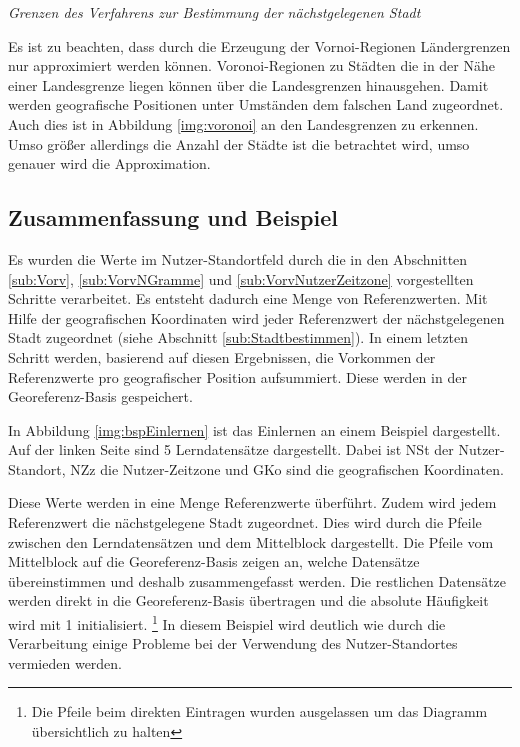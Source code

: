 			\textit{Grenzen des Verfahrens zur Bestimmung der nächstgelegenen Stadt}

				Es ist zu beachten, dass durch die Erzeugung der Vornoi-Regionen Ländergrenzen nur approximiert werden können. 
				Voronoi-Regionen zu Städten die in der Nähe einer Landesgrenze liegen können über die Landesgrenzen hinausgehen. 
				Damit werden geografische Positionen unter Umständen dem falschen Land zugeordnet.
				Auch dies ist in Abbildung \ref{img:voronoi} an den Landesgrenzen zu erkennen. 
				Umso größer allerdings die Anzahl der Städte ist die betrachtet wird, umso genauer wird die Approximation. 

		\subsection{Zusammenfassung und Beispiel}

			Es wurden die Werte im Nutzer-Standortfeld durch die in den Abschnitten \ref{sub:Vorv}, \ref{sub:VorvNGramme} und \ref{sub:VorvNutzerZeitzone} vorgestellten Schritte verarbeitet.
			Es entsteht dadurch eine Menge von Referenzwerten.
			Mit Hilfe der geografischen Koordinaten wird jeder Referenzwert der nächstgelegenen Stadt zugeordnet (siehe Abschnitt \ref{sub:Stadtbestimmen}). 
			In einem letzten Schritt werden, basierend auf diesen Ergebnissen, die Vorkommen der Referenzwerte pro geografischer Position aufsummiert.
			Diese werden in der Georeferenz-Basis gespeichert.

			In Abbildung \ref{img:bspEinlernen} ist das Einlernen an einem Beispiel dargestellt.
			Auf der linken Seite sind 5 Lerndatensätze dargestellt.
			Dabei ist NSt der Nutzer-Standort, NZz die Nutzer-Zeitzone und GKo sind die geografischen Koordinaten.
			
			Diese Werte werden in eine Menge Referenzwerte überführt.
			Zudem wird jedem Referenzwert die nächstgelegene Stadt zugeordnet.
			Dies wird durch die Pfeile zwischen den Lerndatensätzen und dem Mittelblock dargestellt.
			Die Pfeile vom Mittelblock auf die Georeferenz-Basis zeigen an, welche Datensätze übereinstimmen und deshalb zusammengefasst werden. 
			Die restlichen Datensätze werden direkt in die Georeferenz-Basis übertragen und die absolute Häufigkeit wird mit 1 initialisiert. \footnote{Die Pfeile beim direkten Eintragen wurden ausgelassen um das Diagramm übersichtlich zu halten} 
			In diesem Beispiel wird deutlich wie durch die Verarbeitung einige Probleme bei der Verwendung des Nutzer-Standortes vermieden werden.

